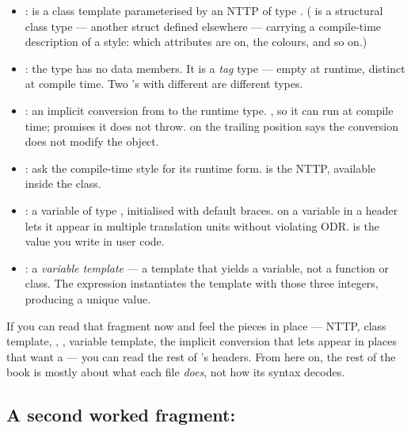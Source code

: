 \begin{itemize}[leftmargin=*]
  \item {}:  is a class
    template parameterised by an NTTP  of type
    . ( is a structural class type
    --- another struct defined elsewhere --- carrying a compile-time
    description of a style: which attributes are on, the colours,
    and so on.)
  \item {}: the type has no data
    members. It is a \emph{tag} type --- empty at runtime, distinct
    at compile time. Two 's with different 
    are different types.
  \item {}: an
    implicit conversion from  to the runtime
     type. , so it can run at compile
    time;  promises it does not throw. 
    on the trailing position says the conversion does not modify
    the object.
  \item {}: ask the compile-time style for
    its runtime form.  is the NTTP, available inside the
    class.
  \item {}: a
     variable of type
    , initialised with default braces.
     on a variable in a header lets it appear in
    multiple translation units without violating ODR.  is
    the value you write in user code.
  \item {}: a \emph{variable template} ---  a
    template that yields a variable, not a function or class. The
    expression  instantiates the template with
    those three integers, producing a unique 
    value.
\end{itemize}

If you can read that fragment now and feel the pieces in place ---
NTTP, class template, , ,
variable template, the implicit conversion that lets 
appear in places that want a  --- you can read the rest
of \maya{}'s headers. From here on, the rest of the book is mostly
about what each file \emph{does}, not how its syntax decodes.

\subsection{A second worked fragment: }

